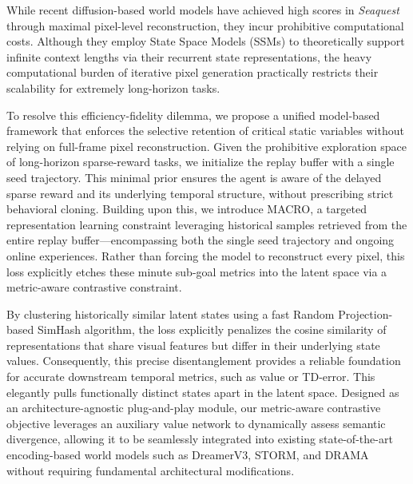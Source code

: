 \documentclass{article} %
\begin{document}
While recent diffusion-based world models \citep[e.g., EDELINE;][]{lee2026edeline} have achieved high scores in \textit{Seaquest} through maximal pixel-level reconstruction, they incur prohibitive computational costs. Although they employ State Space Models (SSMs) to theoretically support infinite context lengths via their recurrent state representations, the heavy computational burden of iterative pixel generation practically restricts their scalability for extremely long-horizon tasks.

To resolve this efficiency-fidelity dilemma, we propose a unified model-based framework that enforces the selective retention of critical static variables without relying on full-frame pixel reconstruction. Given the prohibitive exploration space of long-horizon sparse-reward tasks, we initialize the replay buffer with a single seed trajectory. This minimal prior ensures the agent is aware of the delayed sparse reward and its underlying temporal structure, without prescribing strict behavioral cloning. Building upon this, we introduce MACRO, a targeted representation learning constraint leveraging historical samples retrieved from the entire replay buffer—encompassing both the single seed trajectory and ongoing online experiences. Rather than forcing the model to reconstruct every pixel, this loss explicitly etches these minute sub-goal metrics into the latent space via a metric-aware contrastive constraint.

By clustering historically similar latent states using a fast Random Projection-based SimHash algorithm, the loss explicitly penalizes the cosine similarity of representations that share visual features but differ in their underlying state values. Consequently, this precise disentanglement provides a reliable foundation for accurate downstream temporal metrics, such as value or TD-error. This elegantly pulls functionally distinct states apart in the latent space. Designed as an architecture-agnostic plug-and-play module, our metric-aware contrastive objective leverages an auxiliary value network to dynamically assess semantic divergence, allowing it to be seamlessly integrated into existing state-of-the-art encoding-based world models such as DreamerV3, STORM, and DRAMA \citep{hafner2025mastering, zhang2023storm, wang2025drama} without requiring fundamental architectural modifications.
\end{document}
